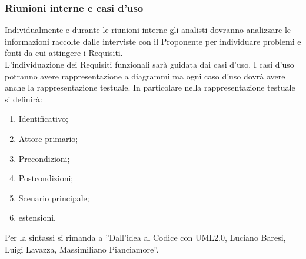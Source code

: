 {{			\subsubsection{Riunioni interne e casi d'uso}
			Individualmente e durante le riunioni interne gli analisti dovranno analizzare le informazioni raccolte dalle interviste con il Proponente per individuare problemi e fonti da cui attingere i Requisiti.\\
			L’individuazione dei Requisiti funzionali sarà guidata dai casi d’uso. I casi d’uso potranno avere rappresentazione a diagrammi ma ogni caso d’uso dovrà avere anche la rappresentazione testuale. In particolare nella rappresentazione testuale si definirà:
			\begin{enumerate}
				\item Identificativo;
				\item Attore primario;
				\item Precondizioni;
				\item Postcondizioni;
				\item Scenario principale;
				\item estensioni.
			\end{enumerate}
			Per la sintassi si rimanda a ”Dall’idea al Codice con UML2.0, Luciano Baresi, Luigi Lavazza, Massimiliano Pianciamore”.
			}
}
